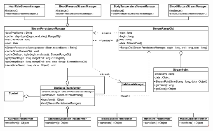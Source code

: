 \begin{center}
\begin{figure}[h]
	\includegraphics[width=15cm, height=10cm]{StatisticsSubsystem/statisticsClassDiagram.png}
\end{figure}
\end{center}

